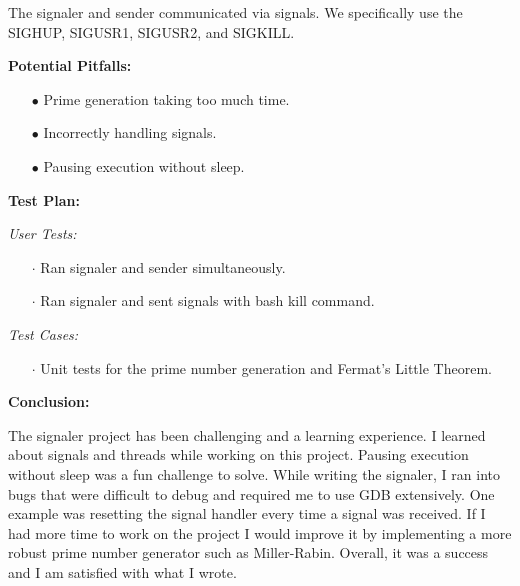 \documentclass{article}
\begin{document}
The signaler and sender communicated via signals. We specifically use the 
SIGHUP, SIGUSR1, SIGUSR2, and SIGKILL. 
\vspace{.5pc}

\begin{flushleft}
\textbf{Potential Pitfalls:}
\vspace{.5pc}
\end{flushleft}

\begin{itemize}
	\item[$\bullet$] Prime generation taking too much time.
	\item[$\bullet$] Incorrectly handling signals.
	\item[$\bullet$] Pausing execution without sleep.
\end{itemize}
\vspace{.5pc}

\begin{flushleft}
\textbf{Test Plan:}
\vspace{.5pc}
\end{flushleft}

\textit{User Tests:}
\begin{itemize}
	\item[$\cdot$] Ran signaler and sender simultaneously.
	\item[$\cdot$] Ran signaler and sent signals with bash kill command. 
\end{itemize}

\textit{Test Cases:}
\begin{itemize}
	\item[$\cdot$] Unit tests for the prime number generation and Fermat's
	Little Theorem.
	\end{itemize}
\vspace{.5pc}

\begin{flushleft}
\textbf{Conclusion:}
\vspace{.5pc}
\end{flushleft}

The signaler project has been challenging and a learning experience. I learned 
about signals and threads while working on this project. Pausing execution 
without sleep was a fun challenge to solve. While writing the signaler, I
ran into bugs that were difficult to debug and required me to use GDB 
extensively. One example was resetting the signal handler every time a signal
was received. If I had more time to work on the project I would improve it
by implementing a more robust prime number generator such as Miller-Rabin.
Overall, it was a success and I am satisfied with what I wrote. 
\end{document}
